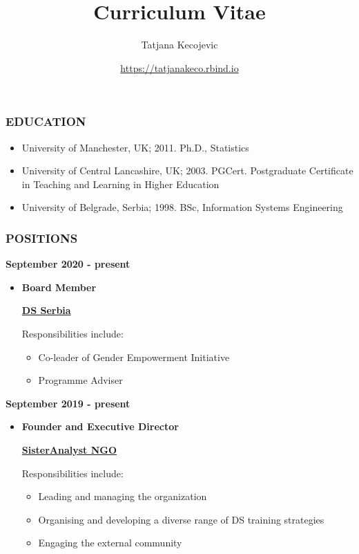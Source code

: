 \documentclass[
]{article}
\title{Curriculum Vitae}
\author{Tatjana Kecojevic}
\date{\url{https://tatjanakeco.rbind.io}}
\providecommand{\tightlist}{%
  \setlength{\itemsep}{0pt}\setlength{\parskip}{0pt}}
\begin{document}
\maketitle

\hypertarget{education}{%
\subsubsection{EDUCATION}\label{education}}

\begin{itemize}
\tightlist
\item
  University of Manchester, UK; 2011. Ph.D., Statistics
\item
  University of Central Lancashire, UK; 2003. PGCert. Postgraduate
  Certificate in Teaching and Learning in Higher Education
\item
  University of Belgrade, Serbia; 1998. BSc, Information Systems
  Engineering
\end{itemize}

\hypertarget{positions}{%
\subsubsection{POSITIONS}\label{positions}}

\textbf{September 2020 - present}

\begin{itemize}
\item
  \textbf{Board Member}

  \href{https://datasciconference.com/}{\textbf{DS Serbia}}

  Responsibilities include:

  \begin{itemize}
  \tightlist
  \item
    Co-leader of Gender Empowerment Initiative
  \item
    Programme Adviser
  \end{itemize}
\end{itemize}

\textbf{September 2019 - present}

\begin{itemize}
\item
  \textbf{Founder and Executive Director}

  \href{https://sisteranalyst.org}{\textbf{SisterAnalyst NGO}}

  Responsibilities include:

  \begin{itemize}
  \tightlist
  \item
    Leading and managing the organization
  \item
    Organising and developing a diverse range of DS training strategies
  \item
    Engaging the external community
  \end{itemize}
\end{itemize}
\end{document}
